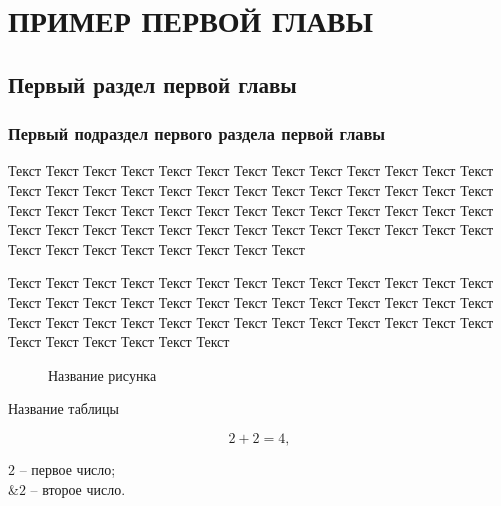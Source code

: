 \chapter{ПРИМЕР ПЕРВОЙ ГЛАВЫ}
\section{Первый раздел первой главы}
\subsection{Первый подраздел первого раздела первой главы}

Текст Текст Текст Текст Текст Текст Текст Текст Текст Текст Текст Текст Текст Текст Текст Текст Текст Текст Текст Текст Текст Текст Текст Текст Текст Текст Текст Текст Текст Текст Текст Текст Текст Текст Текст Текст Текст Текст Текст Текст Текст Текст Текст Текст Текст Текст Текст Текст Текст Текст Текст Текст Текст Текст Текст Текст Текст Текст Текст Текст 

Текст Текст Текст Текст Текст Текст Текст Текст Текст Текст Текст Текст Текст Текст Текст Текст Текст Текст Текст Текст Текст Текст Текст Текст Текст Текст Текст Текст Текст Текст Текст Текст Текст Текст Текст Текст Текст Текст Текст Текст Текст Текст Текст Текст Текст

\begin{figure}
  \caption{Название рисунка}
\end{figure}

\begin{table}
  \caption{Название таблицы}
\end{table}

\begin{equation}
2 + 2 = 4,
\end{equation}

\begin{eqrem}
$2$ -- первое число;\\
&$2$ -- второе число.
\end{eqrem}